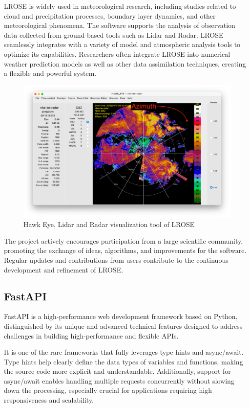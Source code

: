 LROSE is widely used in meteorological research, including studies related to cloud and precipitation processes, boundary layer dynamics, and other meteorological phenomena. The software supports the analysis of observation data collected from ground-based tools such as Lidar and Radar. LROSE seamlessly integrates with a variety of model and atmospheric analysis tools to optimize its capabilities. Researchers often integrate LROSE into numerical weather prediction models as well as other data assimilation techniques, creating a flexible and powerful system.

\begin{figure}[H]
    \centering
    \includegraphics[width=0.8\linewidth]{Images/3.5-hawk-eye.png}
    \caption{Hawk Eye, Lidar and Radar visualization tool of LROSE}
    \label{fig:hawk-eye}
\end{figure}

The project actively encourages participation from a large scientific community, promoting the exchange of ideas, algorithms, and improvements for the software. Regular updates and contributions from users contribute to the continuous development and refinement of LROSE.

\subsection{FastAPI}
FastAPI is a high-performance web development framework based on Python, distinguished by its unique and advanced technical features designed to address challenges in building high-performance and flexible APIs.

It is one of the rare frameworks that fully leverages type hints and async/await. Type hints help clearly define the data types of variables and functions, making the source code more explicit and understandable. Additionally, support for async/await enables handling multiple requests concurrently without slowing down the processing, especially crucial for applications requiring high responsiveness and scalability.

